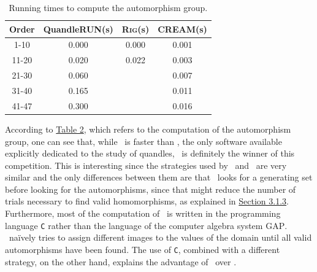 \begin{table}[H]

    \centering
    \begin{tabular}{|c|c|c|c|}
        \hline
         Order & \textsf{QuandleRUN}(s) & \textsc{Rig}(s) & \textsc{CREAM}(s) \\ \hline
         1-10 & 0.000 & 0.000 & 0.001 \\ \hline
         11-20 & 0.020 & 0.022 & 0.003 \\ \hline
         21-30 & 0.060 & &  0.007 \\ \hline
         31-40 & 0.165 & & 0.011  \\ \hline
         41-47 & 0.300 & & 0.016 \\ \hline
    \end{tabular}
    
    \caption{Running times to compute the automorphism group.}
    \label{AutTable}
\end{table}
\noindent According to \hyperref[AutTable]{Table 2}, which refers to the computation of the automorphism group, one can see that, while \Software~is faster than \rig, the only software available explicitly dedicated to the study of quandles, \cream~is definitely the winner of this competition. This is interesting since the strategies used by \rig~and \cream~are very similar and the only differences between them are that \cream~looks for a generating set before looking for the automorphisms, since that might reduce the number of trials necessary to find valid homomorphisms, as explained in \hyperref[monomorphismAlgo]{Section 3.1.3}. Furthermore, most of the computation of \cream~is written in the programming language \texttt{C} rather than the language of the computer algebra system \textsc{GAP}.
\rig~naïvely tries to assign different images to the values of the domain until all valid automorphisms have been found. The use of \texttt{C}, combined with a different strategy, on the other hand, explains the advantage of \cream~over \Software.
 
